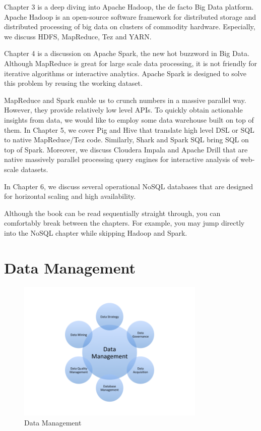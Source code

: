 \documentclass[12pt]{book}
\begin{document}
Chapter 3 is a deep diving into Apache Hadoop, the de facto Big Data platform. Apache Hadoop is an open-source software framework for distributed storage and distributed processing of big data on clusters of commodity hardware. Especially, we discuss HDFS, MapReduce, Tez and YARN.

Chapter 4 is a discussion on Apache Spark, the new hot buzzword in Big Data. Although MapReduce is great for large scale data processing, it is not friendly for iterative algorithms or interactive analytics. Apache Spark is designed to solve this problem by reusing the working dataset. 

MapReduce and Spark enable us to crunch numbers in a massive parallel way. However, they provide relatively low level APIs. To quickly obtain actionable insights from data, we would like to employ some data warehouse built on top of them. In Chapter 5, we cover Pig and Hive that translate high level DSL or SQL to native MapReduce/Tez code. Similarly, Shark and Spark SQL bring SQL on top of Spark. Moreover, we discuss Cloudera Impala and Apache Drill that are native massively parallel processing query engines for interactive analysis of web-scale datasets. 

In Chapter 6, we discuss several operational NoSQL databases that are designed for horizontal scaling and high availability.

Although the book can be read sequentially straight through, you can comfortably break between the chapters. For example, you may jump directly into the NoSQL chapter while skipping Hadoop and Spark. 

\chapter{Data Management}
\begin{figure}[t]
\includegraphics[width=0.8\textwidth]{images/data-management.png}
\centering
\caption{Data Management}
\end{figure}
\end{document}
